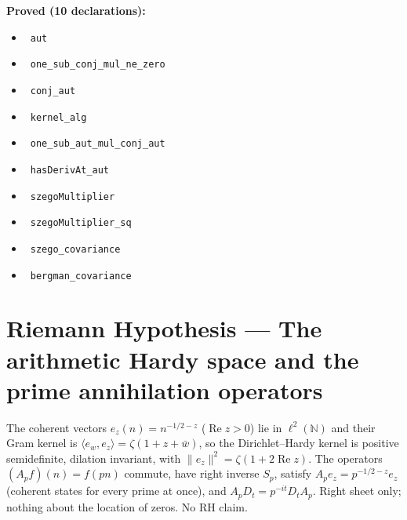 \documentclass{report}
\theoremstyle{definition}
\begin{document}
\noindent\textbf{Proved (10 declarations):}
\begin{itemize}
  \item {}\leanok\ \texttt{aut}
  \item {}\leanok\ \texttt{one\_sub\_conj\_mul\_ne\_zero}
  \item {}\leanok\ \texttt{conj\_aut}
  \item {}\leanok\ \texttt{kernel\_alg}
  \item {}\leanok\ \texttt{one\_sub\_aut\_mul\_conj\_aut}
  \item {}\leanok\ \texttt{hasDerivAt\_aut}
  \item {}\leanok\ \texttt{szegoMultiplier}
  \item {}\leanok\ \texttt{szegoMultiplier\_sq}
  \item {}\leanok\ \texttt{szego\_covariance}
  \item {}\leanok\ \texttt{bergman\_covariance}
\end{itemize}

\section{Riemann Hypothesis --- The arithmetic Hardy space and the prime annihilation operators}
The coherent vectors $e_z(n)=n^{-1/2-z}$ ($\operatorname{Re}z>0$) lie in $\ell^2(\mathbb N)$ and their Gram kernel is $\langle e_w,e_z\rangle=\zeta(1+z+\bar w)$, so the Dirichlet--Hardy kernel is positive semidefinite, dilation invariant, with $\|e_z\|^2=\zeta(1+2\operatorname{Re}z)$. The operators $(A_pf)(n)=f(pn)$ commute, have right inverse $S_p$, satisfy $A_pe_z=p^{-1/2-z}e_z$ (coherent states for every prime at once), and $A_pD_t=p^{-it}D_tA_p$. Right sheet only; nothing about the location of zeros. No RH claim.
\end{document}
